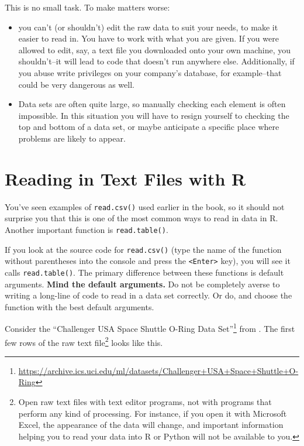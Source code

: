 \documentclass[
  12pt,
  krantz2]{krantz}
\renewcommand{\href}[2]{#2\footnote{\url{#1}}}
\begin{document}
This is no small task. To make matters worse:

\begin{itemize}
\item
  you can't (or shouldn't) edit the raw data to suit your needs, to make it easier to read in. You have to work with what you are given. If you were allowed to edit, say, a text file you downloaded onto your own machine, you shouldn't--it will lead to code that doesn't run anywhere else. Additionally, if you abuse write privileges on your company's database, for example--that could be very dangerous as well.
\item
  Data sets are often quite large, so manually checking each element is often impossible. In this situation you will have to resign yourself to checking the top and bottom of a data set, or maybe anticipate a specific place where problems are likely to appear.
\end{itemize}

\hypertarget{reading-in-text-files-with-r}{%
\section{Reading in Text Files with R}\label{reading-in-text-files-with-r}}

You've seen examples of \texttt{read.csv()} used earlier in the book, so it should not surprise you that this is one of the most common ways to read in data in R. Another important function is \texttt{read.table()}.

If you look at the source code for \texttt{read.csv()} (type the name of the function without parentheses into the console and press the \texttt{\textless{}Enter\textgreater{}} key), you will see it calls \texttt{read.table()}. The primary difference between these functions is default arguments. \textbf{Mind the default arguments.} Do not be completely averse to writing a long-line of code to read in a data set correctly. Or do, and choose the function with the best default arguments.

Consider the \href{https://archive.ics.uci.edu/ml/datasets/Challenger+USA+Space+Shuttle+O-Ring}{``Challenger USA Space Shuttle O-Ring Data Set''} from \citep{uci_data}. The first few rows of the raw text file\footnote{Open raw text files with text editor programs, not with programs that perform any kind of processing. For instance, if you open it with Microsoft Excel, the appearance of the data will change, and important information helping you to read your data into R or Python will not be available to you.} looks like this.
\end{document}
